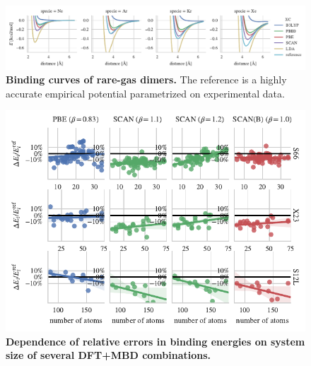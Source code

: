 \documentclass[twocolumn]{article}
\begin{document}
\begin{figure}
\includegraphics[center]{media/mbd-rare-gas}
\caption{\textbf{Binding curves of rare-gas dimers.}
The reference is a highly accurate empirical potential parametrized on experimental data.
}\label{fig:mbd-rare-gas}
\end{figure}

\begin{figure}
\includegraphics[center]{media/size-dependence}
\caption{\textbf{Dependence of relative errors in binding energies on system size of several DFT+MBD combinations.}
}\label{fig:size-dependence}
\end{figure}
\end{document}
